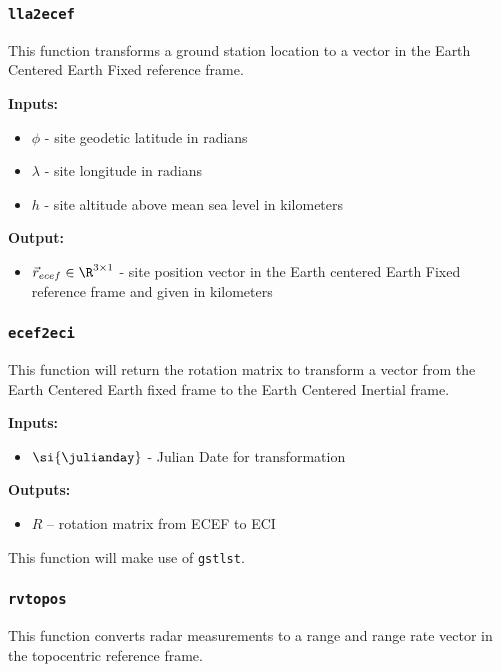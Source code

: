 \documentclass[11pt, reqno]{article}    %
\begin{document}
\subsubsection*{\texttt{lla2ecef}}
This function transforms a ground station location to a vector in the Earth Centered Earth Fixed reference frame.

\noindent \textbf{Inputs: }
\begin{itemize}
    \item \( \phi \) - site geodetic latitude in radians
    \item \( \lambda \) - site longitude in radians
    \item \( h \) - site altitude above mean sea level in kilometers
\end{itemize}

\noindent \textbf{Output:}
\begin{itemize}
    \item \( \vec r_{ecef} \in \R^{3 \times 1} \) - site position vector in the Earth centered Earth Fixed reference frame and given in kilometers
\end{itemize}

\subsubsection*{\texttt{ecef2eci}}
This function will return the rotation matrix to transform a vector from the Earth Centered Earth fixed frame to the Earth Centered Inertial frame.

\noindent \textbf{Inputs: }
\begin{itemize}
    \item \( \si{\julianday} \) - Julian Date for transformation
\end{itemize}

\noindent \textbf{Outputs: }
\begin{itemize}
    \item \( R \) -- rotation matrix from ECEF to ECI
\end{itemize}

This function will make use of \texttt{gstlst}.

\subsubsection*{\texttt{rvtopos}}
This function converts radar measurements to a range and range rate vector in the topocentric reference frame.
\end{document}
